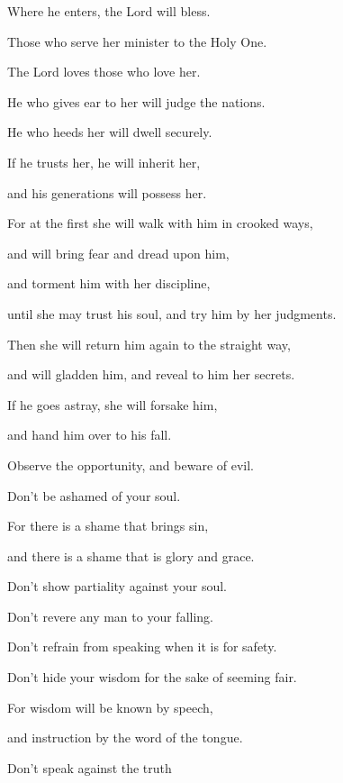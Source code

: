 {\par }{\QB Where
 he enters, the Lord will bless.
\par }{\Q {}Those who serve her minister to the Holy One.
\par }{\QB The Lord loves those who love her.
\par }{\Q {}He who gives ear to her will judge the nations.
\par }{\QB He who heeds her will dwell securely.
\par }{\Q {}If he trusts her, he will inherit her,
\par }{\QB and his generations will possess her.
\par }{\Q {}For at the first she will walk with him in crooked ways,
\par }{\QB and will bring fear and dread upon him,
\par }{\QB and torment him with her discipline,
\par }{\QB until she may trust his soul, and try him by her judgments.
\par }{\Q {}Then she will return him again to the straight way,
\par }{\QB and will gladden him, and reveal to him her secrets.
\par }{\Q {}If he goes astray, she will forsake him,
\par }{\QB and hand him over to his fall.
\par }{\BB \par }{\Q {}Observe the opportunity, and beware of evil.
\par }{\QB Don’t be ashamed of your soul.
\par }{\Q {}For there is a shame that brings sin,
\par }{\QB and there is a shame that is glory and grace.
\par }{\Q {}Don’t show partiality against your soul.
\par }{\QB Don’t revere any man to your falling.
\par }{\Q {}Don’t refrain from speaking when it is for safety.
\par }{\QB {}Don’t hide your wisdom for the sake of seeming fair.
\par }{\Q {}For wisdom will be known by speech,
\par }{\QB and instruction by the word of the tongue.
\par }{\Q {}Don’t speak against the truth
}
